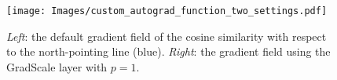\begin{figure}
    \centering
    \texttt{[image: Images/custom\_autograd\_function\_two\_settings.pdf]}
    \caption{\emph{Left}: the default gradient field of the cosine similarity with respect to the north-pointing line (blue). \emph{Right}: the gradient field using the GradScale layer with $p=1$.}
    \label{fig:grad_scaling}
\end{figure}


\begin{table}
    \centering
    \caption{$k$-nn accuracies at epoch 500 for default, cut-initialized and GradScale training on standard image datasets.}\vspace*{0.1cm}
    \label{tbl:accuracies}
\end{table}

